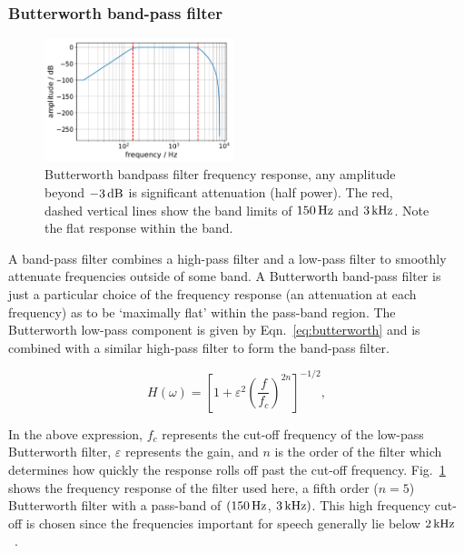\documentclass[paper-main.tex]{subfiles}
\begin{document}
\subsubsection{Butterworth band-pass filter}

\begin{figure}
	\includegraphics[width=0.49\textwidth]{figures/butterworth_150_3000.pdf}
	\caption{Butterworth bandpass filter frequency response, any amplitude beyond $-3\,{\rm dB}$ is significant attenuation (half power). The red, dashed vertical lines show the band limits of $150\,{\rm Hz}$ and $3\,{\rm kHz}$. Note the flat response within the band.}
	\label{fig:butterworth}
\end{figure}

A band-pass filter combines a high-pass filter and a low-pass filter to smoothly attenuate frequencies outside of some band. A Butterworth band-pass filter is just a particular choice of the frequency response (an attenuation at each frequency) as to be `maximally flat' within the pass-band region. The Butterworth low-pass component is given by Eqn.~\ref{eq:butterworth} and is combined with a similar high-pass filter to form the band-pass filter.

\begin{equation}
\label{eq:butterworth}
H(\omega) = \left[1+\varepsilon^2 \left( \frac{f}{f_c} \right)^{2n}\right]^{-1/2},
\end{equation}

In the above expression, $f_c$ represents the cut-off frequency of the low-pass Butterworth filter, $\varepsilon$ represents the gain, and $n$ is the order of the filter which determines how quickly the response rolls off past the cut-off frequency. Fig.~\ref{fig:butterworth} shows the frequency response of the filter used here, a fifth order ($n = 5$) Butterworth filter with a pass-band of $(150\,{\rm Hz}$, $3\,{\rm kHz})$. This high frequency cut-off is chosen since the frequencies important for speech generally lie below $2\,{\rm kHz}$~\cite{speech_intelligibility}.
\end{document}
